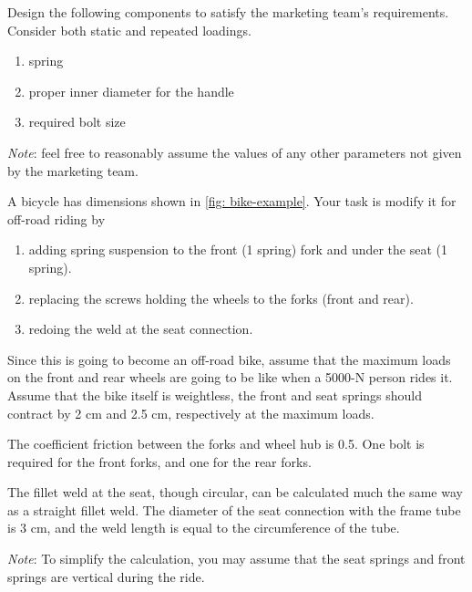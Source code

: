 \documentclass[
10pt,
a4paper,
openany,
svgnames,
]{book}
\newcommand{\exercise}{%
\item \label{lab:\arabic{chapter}-\arabic{exercisesi}}  %
}
\begin{document}
\begin{exercises}
  Design the following components to satisfy the marketing team's
  requirements. Consider both static and repeated loadings.
  
  \begin{enumerate}
  \item spring
  \item proper inner diameter for the handle
  \item required bolt size
  \end{enumerate}
  
  \emph{Note}: feel free to reasonably assume the values of any other
  parameters not given by the marketing team.
  
  \exercise \label{exercise: bike-total-redesign} A bicycle has dimensions shown in \cref{fig: bike-example}. Your task is modify it for off-road riding by
  \begin{enumerate}
  \item adding spring suspension to the front (1 spring) fork and under the seat (1 spring).
  \item replacing the screws holding the wheels to the forks (front and rear).
  \item redoing the weld at the seat connection.
  \end{enumerate}
  
  Since this is going to become an off-road bike, assume that the maximum loads on the front and rear wheels are going to be like when a 5000-N person rides it. Assume that the bike itself is weightless, the front and seat springs should contract by 2 cm and 2.5 cm, respectively at the maximum loads.
  
  The coefficient friction between the forks and wheel hub is 0.5. One bolt is required for the front forks, and one for the rear forks.
  
  The fillet weld at the seat, though circular, can be calculated much the same way as a straight fillet weld. The diameter of the seat connection with the frame tube is 3 cm, and the weld length is equal to the circumference of the tube.
  
  \emph{Note}: To simplify the calculation, you may assume that the seat springs and front springs are vertical during the ride.
  

\end{exercises}
\end{document}
